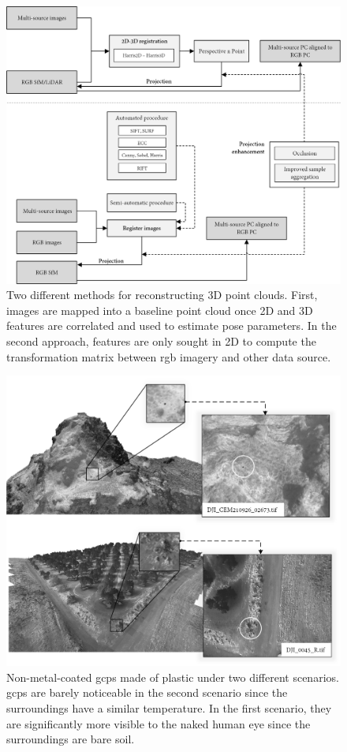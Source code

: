 \begin{figure}[ht]
	\includegraphics[width=\linewidth]{figs/context/fusion_03.png}
	\caption{Two different methods for reconstructing 3D point clouds. First, images are mapped into a baseline point cloud once 2D and 3D features are correlated and used to estimate pose parameters. In the second approach, features are only sought in 2D to compute the transformation matrix between \acrshort{rgb} imagery and other data source. }
    \label{fig:fusion_data_03}
\end{figure}

\begin{figure}[ht]
	\includegraphics[width=\textwidth]{figs/context/gcps.png}
	\caption{Non-metal-coated \acrshort{gcp}s made of plastic under two different scenarios. \acrshort{gcp}s are barely noticeable in the second scenario since the surroundings have a similar temperature. In the first scenario, they are significantly more visible to the naked human eye since the surroundings are bare soil. }
    \label{fig:gcps_thermography}
\end{figure}

